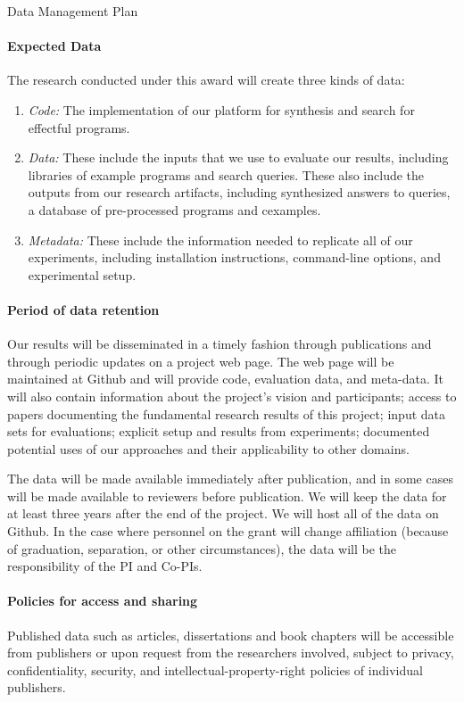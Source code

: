 \documentclass[12pt]{article}
\begin{document}
 \begin{large}
\begin{center}
Data Management Plan
\end{center}
\end{large}
\setcounter{page}{1}

\paragraph{Expected Data} The research conducted under this award will
create three kinds of data:

\begin{enumerate}
\item \textit{Code:} The implementation of our platform for synthesis and search for
effectful programs.

\item \textit{Data:} These include the inputs that we use to evaluate our results, including libraries of example programs and search queries.  These also include the outputs from our research artifacts, including synthesized answers to queries, a database of pre-processed programs and cexamples.

\item \textit{Metadata:} These include the information needed to
  replicate all of our experiments, including installation instructions,
  command-line options, and experimental
  setup.
\end{enumerate}

\paragraph{Period of data retention} Our results will be disseminated in
a timely fashion through publications and through periodic updates on
a project web page. The web page will be maintained at Github and will
provide code, evaluation data, and meta-data.  It will also contain information about the project's
vision and participants; access to papers documenting the fundamental
research results of this project; input data sets for evaluations;
explicit setup and results from experiments; documented potential uses
of our approaches and their applicability to other domains. 

The data will be made available immediately after
publication, and in some cases will be made available to reviewers
before publication. We will keep the data for at least three years
after the end of the project. We will host all of the data on Github. In the case where personnel on the grant will change affiliation
(because of graduation, separation, or other circumstances), the data
will be the responsibility of the PI and Co-PIs. 

\paragraph{Policies for access and sharing} 
Published data such as articles, dissertations and book chapters will
be accessible from publishers or upon request from the researchers
involved, subject to privacy, confidentiality, security, and
intellectual-property-right policies of individual publishers.
\end{document}

